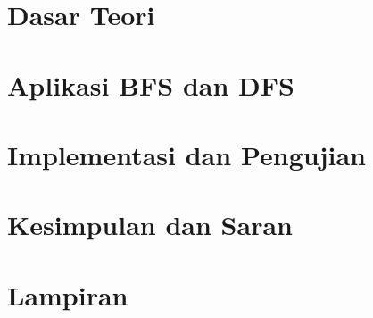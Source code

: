 \documentclass[12pt,a4paper]{report}
\begin{document}
\chapter{Dasar Teori}


\chapter{Aplikasi BFS dan DFS}


\chapter{Implementasi dan Pengujian}


\chapter{Kesimpulan dan Saran}


\chapter{Lampiran}


\nocite{*}

\end{document}
